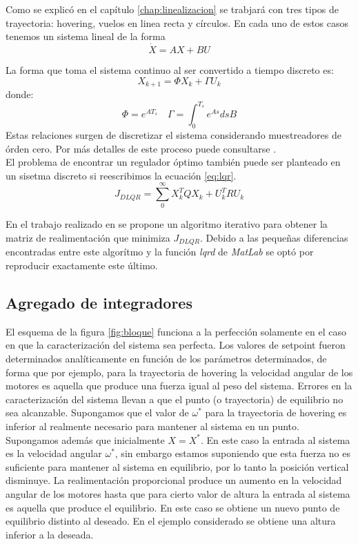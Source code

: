 \documentclass[main]{subfiles}
\begin{document}
Como se explic\'o en el cap\'itulo \ref{chap:linealizacion} se trabjar\'a con tres tipos de trayectoria: hovering, vuelos en linea recta y c\'irculos. En cada uno de estos casos tenemos un sistema lineal de la forma 
\begin{equation}
\dot{X} = A X + BU
\end{equation}
 
La forma que toma el sistema continuo al ser convertido a tiempo discreto es: 
\begin{equation}
X_{k+1} = \Phi X_k + \Gamma U_k
\end{equation}
donde:
\begin{equation}
\Phi = e^{AT_s} \quad \Gamma = \int_0^{T_s} e^{A s} ds B
\end{equation}
Estas relaciones surgen de discretizar el sistema considerando muestreadores de \'orden cero. Por m\'as detalles de este proceso puede consultarse \cite{bib:hakas}.\\

El problema de encontrar un regulador \'optimo tambi\'en puede ser planteado en un sisetma discreto si reescribimos la ecuaci\'on \ref{eq:lqr}. 
\begin{equation}
\label{eq:dlqr}
J_{DLQR} = \sum_0^\infty X_k^T Q X_k + U_k^T R U_k
\end{equation}

En el trabajo realizado en \cite{bib:lqr-discreto} se propone un algoritmo iterativo para obtener la matriz de realimentaci\'on que minimiza $J_{DLQR}$. Debido a las pequeñas diferencias encontradas entre este algor\'itmo y la funci\'on \emph{lqrd} de \emph{MatLab}  se opt\'o por reproducir exactamente este \'ultimo.

\subsection{Agregado de integradores}

El esquema de la figura \ref{fig:bloque} funciona a la perfecci\'on solamente en el caso en que la caracterizaci\'on del sistema sea perfecta. Los valores de setpoint fueron determinados anal\'iticamente en funci\'on de los par\'ametros determinados, de forma que por ejemplo, para la trayectoria de hovering la velocidad angular de los motores es aquella que produce una fuerza igual al peso del sistema. Errores en la caracterizaci\'on del sistema llevan a que el punto (o trayectoria) de equilibrio no sea alcanzable. Supongamos que el valor de $\omega^*$ para la trayectoria de hovering es inferior al realmente necesario para mantener al sistema en un punto. Supongamos adem\'as que inicialmente $X = X^*$. En este caso la entrada al sistema es la velocidad angular $\omega^*$, sin embargo estamos suponiendo que esta fuerza no es suficiente para mantener al sistema en equilibrio, por lo tanto la posici\'on vertical disminuye. La realimentaci\'on proporcional produce un aumento en la velocidad angular de los motores hasta que para cierto valor de altura la entrada al sistema es aquella que produce el equilibrio. En este caso se obtiene un nuevo punto de equilibrio distinto al deseado. En el ejemplo considerado se obtiene una altura inferior a la deseada. \\
\end{document}
